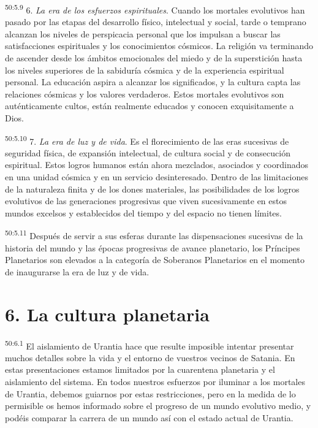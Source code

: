 \par
\textsuperscript{50:5.9} 6. \textit{La era de los esfuerzos espirituales}. Cuando los mortales evolutivos han pasado por las etapas del desarrollo físico, intelectual y social, tarde o temprano alcanzan los niveles de perspicacia personal que los impulsan a buscar las satisfacciones espirituales y los conocimientos cósmicos. La religión va terminando de ascender desde los ámbitos emocionales del miedo y de la superstición hasta los niveles superiores de la sabiduría cósmica y de la experiencia espiritual personal. La educación aspira a alcanzar los significados, y la cultura capta las relaciones cósmicas y los valores verdaderos. Estos mortales evolutivos son auténticamente cultos, están realmente educados y conocen exquisitamente a Dios.

\par
\textsuperscript{50:5.10} 7. \textit{La era de luz y de vida}. Es el florecimiento de las eras sucesivas de seguridad física, de expansión intelectual, de cultura social y de consecución espiritual. Estos logros humanos están ahora mezclados, asociados y coordinados en una unidad cósmica y en un servicio desinteresado. Dentro de las limitaciones de la naturaleza finita y de los dones materiales, las posibilidades de los logros evolutivos de las generaciones progresivas que viven sucesivamente en estos mundos excelsos y establecidos del tiempo y del espacio no tienen límites.

\par
\textsuperscript{50:5.11} Después de servir a sus esferas durante las dispensaciones sucesivas de la historia del mundo y las épocas progresivas de avance planetario, los Príncipes Planetarios son elevados a la categoría de Soberanos Planetarios en el momento de inaugurarse la era de luz y de vida.

\section*{6. La cultura planetaria}
\par
\textsuperscript{50:6.1} El aislamiento de Urantia hace que resulte imposible intentar presentar muchos detalles sobre la vida y el entorno de vuestros vecinos de Satania. En estas presentaciones estamos limitados por la cuarentena planetaria y el aislamiento del sistema. En todos nuestros esfuerzos por iluminar a los mortales de Urantia, debemos guiarnos por estas restricciones, pero en la medida de lo permisible os hemos informado sobre el progreso de un mundo evolutivo medio, y podéis comparar la carrera de un mundo así con el estado actual de Urantia.

